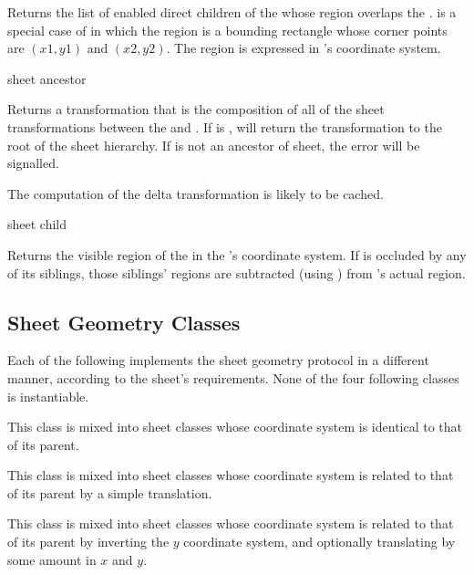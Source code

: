 Returns the list of enabled direct children of the  
whose region overlaps the  .
 is a special case of
 in which the region is a bounding rectangle
whose corner points are $(x1,y1)$ and $(x2,y2)$.  The region is expressed in
's coordinate system.
\FreshOutputs


 {sheet ancestor}

Returns a transformation that is the composition of all of the sheet
transformations between the   and .  If
 is ,  will return the
transformation to the root of the sheet hierarchy.  If  is not an
ancestor of sheet, the  error will be signalled.

The computation of the delta transformation is likely to be cached.

 {sheet child}

Returns the visible region of the   in the 
's coordinate system.  If  is occluded by any of its
siblings, those siblings' regions are subtracted (using )
from 's actual region.


\subsection {Sheet Geometry Classes}

Each of the following implements the sheet geometry protocol in a different
manner, according to the sheet's requirements.  None of the four following
classes is instantiable.


This class is mixed into sheet classes whose coordinate system is identical to
that of its parent.


This class is mixed into sheet classes whose coordinate system is related to
that of its parent by a simple translation.


This class is mixed into sheet classes whose coordinate system is related to
that of its parent by inverting the $y$ coordinate system, and optionally
translating by some amount in $x$ and $y$.

